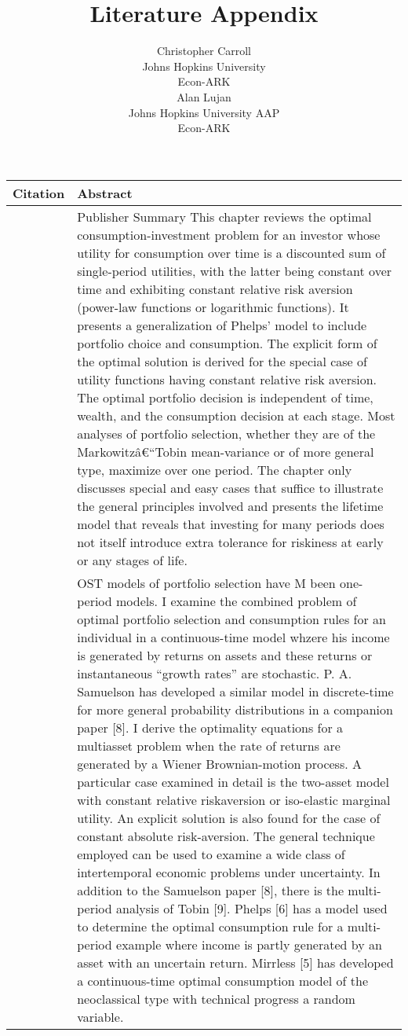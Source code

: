 \documentclass{article}
\title{Literature Appendix}
\date{\displaydate{articleDate}}
\author{Christopher Carroll\footnotemark[1]\\
Johns Hopkins University\\Econ-ARK\\\AND
Alan Lujan\\
Johns Hopkins University AAP\\Econ-ARK\\}
\begin{document}
\maketitle
{}


\keywords{}

\bigskip\noindent
\begin{tabular}{p{}p{}}
\toprule
Citation & Abstract \\
\hline
\cite{Samuelson_1975} & Publisher Summary   This chapter reviews the optimal consumption-investment problem for an investor whose utility for consumption over time is a discounted sum of single-period utilities, with the latter being constant over time and exhibiting constant relative risk aversion (power-law functions or logarithmic functions). It presents a generalization of Phelps' model to include portfolio choice and consumption. The explicit form of the optimal solution is derived for the special case of utility functions having constant relative risk aversion. The optimal portfolio decision is independent of time, wealth, and the consumption decision at each stage. Most analyses of portfolio selection, whether they are of the Markowitzâ€``Tobin mean-variance or of more general type, maximize over one period. The chapter only discusses special and easy cases that suffice to illustrate the general principles involved and presents the lifetime model that reveals that investing for many periods does not itself introduce extra tolerance for riskiness at early or any stages of life. \\
\cite{Merton_1969} & OST models of portfolio selection have M been one-period models. I examine the combined problem of optimal portfolio selection and consumption rules for an individual in a continuous-time model whzere his income is generated by returns on assets and these returns or instantaneous ``growth rates'' are stochastic. P. A. Samuelson has developed a similar model in discrete-time for more general probability distributions in a companion paper [8]. I derive the optimality equations for a multiasset problem when the rate of returns are generated by a Wiener Brownian-motion process. A particular case examined in detail is the two-asset model with constant relative riskaversion or iso-elastic marginal utility. An explicit solution is also found for the case of constant absolute risk-aversion. The general technique employed can be used to examine a wide class of intertemporal economic problems under uncertainty. In addition to the Samuelson paper [8], there is the multi-period analysis of Tobin [9]. Phelps [6] has a model used to determine the optimal consumption rule for a multi-period example where income is partly generated by an asset with an uncertain return. Mirrless [5] has developed a continuous-time optimal consumption model of the neoclassical type with technical progress a random variable. \\

\end{tabular}
\end{document}
